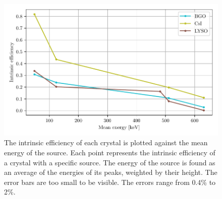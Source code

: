 \documentclass[a4paper, 11pt, table]{article}
\begin{document}
\begin{figure}[H]
    \centering
    \includegraphics[width=\textwidth]{figures/efficiency.pdf}
    \caption{The intrinsic efficiency of each crystal is plotted against the mean energy of the source. Each point represents the intrinsic efficiency of a crystal with a specific source. The energy of the source is found as an average of the energies of its peaks, weighted by their height. The error bars are too small to be visible. The errors range from 0.4\% to 2\%.}
    \label{fig:efficiency}
\end{figure}
\end{document}
